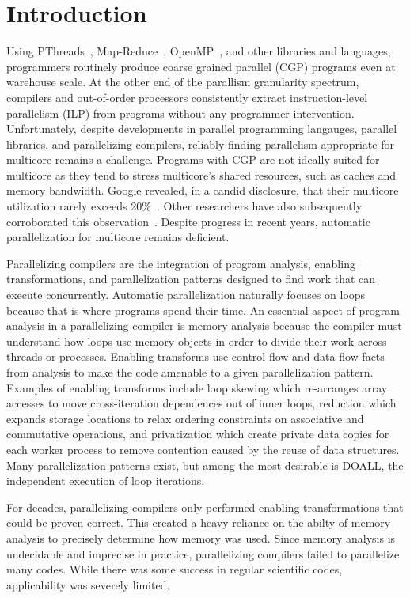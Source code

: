 \section{Introduction}

Using PThreads~\cite{pthreads:spec}, Map-Reduce~\cite{dean:04:osdi},
OpenMP~\cite{openmp:spec}, and other libraries and languages,
programmers routinely produce coarse grained parallel (CGP) programs
even at warehouse scale.  At the other end of the parallism
granularity spectrum, compilers and out-of-order processors
consistently extract instruction-level parallelism (ILP) from programs
without any programmer intervention.  Unfortunately, despite
developments in parallel programming langauges, parallel libraries,
and parallelizing compilers, reliably finding parallelism appropriate
for multicore remains a challenge.  Programs with CGP are not ideally
suited for multicore as they tend to stress multicore's shared
resources, such as caches and memory bandwidth.  Google revealed, in a
candid disclosure, that their multicore utilization rarely exceeds
20\%~\cite{barroso:07:computer}. Other researchers have also
subsequently corroborated this observation~\cite{chung:13:isca}.
Despite progress in recent years, automatic parallelization for
multicore remains deficient.

Parallelizing compilers are the integration of program analysis,
enabling transformations, and parallelization patterns designed to
find work that can execute concurrently.  Automatic parallelization
naturally focuses on loops because that is where programs spend their
time.  An essential aspect of program analysis in a parallelizing
compiler is memory analysis because the compiler must understand how
loops use memory objects in order to divide their work across threads
or processes.  Enabling transforms use control flow and data flow
facts from analysis to make the code amenable to a given
parallelization pattern.  Examples of enabling transforms include loop
skewing which re-arranges array accesses to move cross-iteration
dependences out of inner loops, reduction which expands storage
locations to relax ordering constraints on associative and commutative
operations, and privatization which create private data copies for
each worker process to remove contention caused by the reuse of data
structures.  Many parallelization patterns exist, but among the most
desirable is DOALL, the independent execution of loop iterations.

For decades, parallelizing compilers only performed enabling
transformations that could be proven correct.  This created a heavy
reliance on the abilty of memory analysis to precisely determine how
memory was used.  Since memory analysis is undecidable and imprecise
in practice, parallelizing compilers failed to parallelize many codes.
While there was some success in regular scientific codes,
applicability was severely limited.

